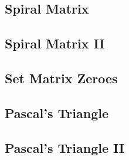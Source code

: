     
\subsection{Spiral Matrix}

\subsection{Spiral Matrix II}

\subsection{Set Matrix Zeroes}

\subsection{Pascal's Triangle}

\subsection{Pascal's Triangle II}

